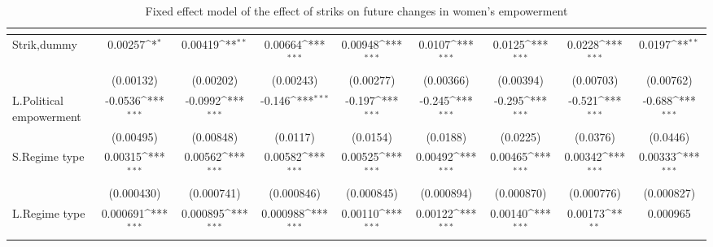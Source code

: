 \begin{table}[htbp]\centering
\def\sym#1{\ifmmode^{#1}\else\(^{#1}\)\fi}
\caption{Fixed effect model of the effect of striks on future changes in women's empowerment \label{fepolemstriksnowar}}
\begin{tabular}{l*{8}{c}}
\hline\hline
                    &&&&&&&&\\
\hline
Strik,dummy         &     0.00257\sym{*}  &     0.00419\sym{**} &     0.00664\sym{***}&     0.00948\sym{***}&      0.0107\sym{***}&      0.0125\sym{***}&      0.0228\sym{***}&      0.0197\sym{**} \\
                    &   (0.00132)         &   (0.00202)         &   (0.00243)         &   (0.00277)         &   (0.00366)         &   (0.00394)         &   (0.00703)         &   (0.00762)         \\
[1em]
L.Political empowerment&     -0.0536\sym{***}&     -0.0992\sym{***}&      -0.146\sym{***}&      -0.197\sym{***}&      -0.245\sym{***}&      -0.295\sym{***}&      -0.521\sym{***}&      -0.688\sym{***}\\
                    &   (0.00495)         &   (0.00848)         &    (0.0117)         &    (0.0154)         &    (0.0188)         &    (0.0225)         &    (0.0376)         &    (0.0446)         \\
[1em]
S.Regime type       &     0.00315\sym{***}&     0.00562\sym{***}&     0.00582\sym{***}&     0.00525\sym{***}&     0.00492\sym{***}&     0.00465\sym{***}&     0.00342\sym{***}&     0.00333\sym{***}\\
                    &  (0.000430)         &  (0.000741)         &  (0.000846)         &  (0.000845)         &  (0.000894)         &  (0.000870)         &  (0.000776)         &  (0.000827)         \\
[1em]
L.Regime type       &    0.000691\sym{***}&    0.000895\sym{***}&    0.000988\sym{***}&     0.00110\sym{***}&     0.00122\sym{***}&     0.00140\sym{***}&     0.00173\sym{**} &    0.000965         \\

\end{tabular}
\end{table}
